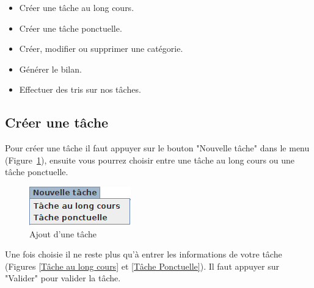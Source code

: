 \documentclass{article}
\begin{document}
\begin{itemize}
	\item Créer une tâche au long cours.
	\item Créer une tâche ponctuelle.
	\item Créer, modifier ou supprimer une catégorie.
	\item Générer le bilan.
	\item Effectuer des tris sur nos tâches.
\end{itemize}

\subsection{Créer une tâche}
Pour créer une tâche il faut appuyer sur le bouton "Nouvelle tâche" dans le menu (Figure~\ref{Taches barre}), ensuite vous pourrez choisir entre une tâche au long cours ou une tâche ponctuelle.

\begin{figure}
	\centering
	\includegraphics[scale=0.8]{images/MenuTache.png}
	\caption{Ajout d'une tâche}
	\label{Taches barre}
\end{figure}

Une fois choisie il ne reste plus qu'à entrer les informations de votre tâche (Figures \ref{Tâche au long cours} et \ref{Tâche Ponctuelle}). Il faut appuyer sur "Valider" pour valider la tâche.
\end{document}
